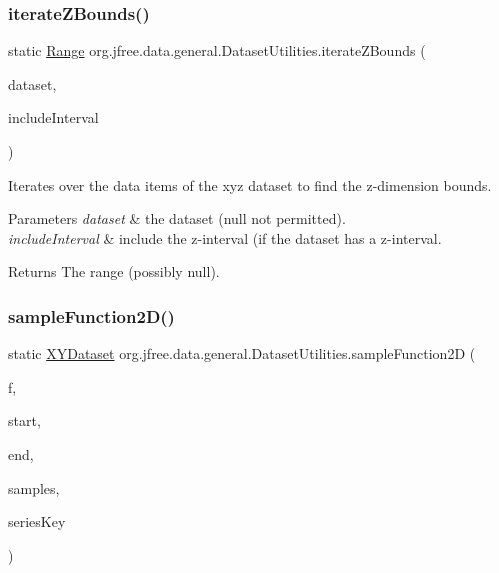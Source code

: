 \subsubsection{\texorpdfstring{iterate\+Z\+Bounds()}{iterateZBounds()}\hspace{0.1cm}{\footnotesize\ttfamily [2/2]}}
{\footnotesize\ttfamily static \mbox{\hyperlink{classorg_1_1jfree_1_1data_1_1_range}{Range}} org.\+jfree.\+data.\+general.\+Dataset\+Utilities.\+iterate\+Z\+Bounds (\begin{DoxyParamCaption}\item[{\mbox{\hyperlink{interfaceorg_1_1jfree_1_1data_1_1xy_1_1_x_y_z_dataset}{X\+Y\+Z\+Dataset}}}]{dataset,  }\item[{boolean}]{include\+Interval }\end{DoxyParamCaption})\hspace{0.3cm}{\ttfamily [static]}}

Iterates over the data items of the xyz dataset to find the z-\/dimension bounds.


\begin{DoxyParams}{Parameters}
{\em dataset} & the dataset ({\ttfamily null} not permitted). \\
\hline
{\em include\+Interval} & include the z-\/interval (if the dataset has a z-\/interval.\\
\hline
\end{DoxyParams}
\begin{DoxyReturn}{Returns}
The range (possibly {\ttfamily null}). 
\end{DoxyReturn}
\mbox{\label{classorg_1_1jfree_1_1data_1_1general_1_1_dataset_utilities_ac1eabf95dc8c6a3d3d22b6a6c80eab43}} 
\subsubsection{\texorpdfstring{sample\+Function2\+D()}{sampleFunction2D()}}
{\footnotesize\ttfamily static \mbox{\hyperlink{interfaceorg_1_1jfree_1_1data_1_1xy_1_1_x_y_dataset}{X\+Y\+Dataset}} org.\+jfree.\+data.\+general.\+Dataset\+Utilities.\+sample\+Function2D (\begin{DoxyParamCaption}\item[{\mbox{\hyperlink{interfaceorg_1_1jfree_1_1data_1_1function_1_1_function2_d}{Function2D}}}]{f,  }\item[{double}]{start,  }\item[{double}]{end,  }\item[{int}]{samples,  }\item[{Comparable}]{series\+Key }\end{DoxyParamCaption})\hspace{0.3cm}{\ttfamily [static]}}

